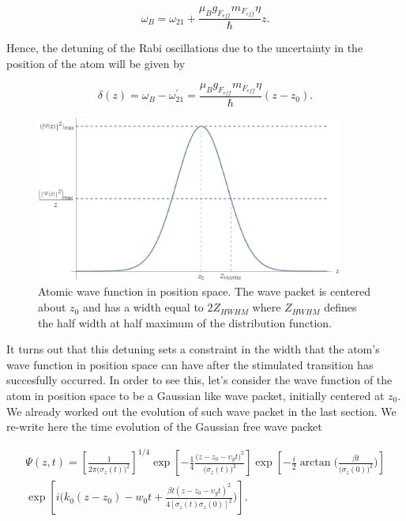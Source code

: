 \documentclass{article}
\begin{document}
\begin{equation}
  \omega_{B} =  \omega_{21} + \frac{\mu_{B} g_{F_{eff}} m_{F_{eff}} \eta}{\hbar} z.
\end{equation}

Hence, the detuning of the Rabi oscillations due to the uncertainty in the position of the atom will be given by

\begin{equation}\label{detunig_atom_width}
  \delta (z) = \omega_{B} - \omega_{21}^{\prime} = \frac{\mu_{B} g_{F_{eff}} m_{F_{eff}} \eta}{\hbar} (z-z_{0}).
\end{equation}

\begin{figure}
\centering
\includegraphics[width=0.9\textwidth]{atom_wave_func_pos_space.png}
\caption{Atomic wave function in position space. The wave packet is centered about $z_{0}$ and has a width equal to $2Z_{HWHM}$ where $Z_{HWHM}$ defines the half width at half maximum of the distribution function.}
\label{atom_wave_func_pos_space}
\end{figure}

It turns out that this detuning sets a constraint in the width that the atom's wave function in position space can have after the stimulated transition has succesfully occurred. In order to see this, let's consider the wave function of the atom in position space to be a Gaussian like wave packet, initially centered at $z_{0}$. We already worked out the evolution of such wave packet in the last section. We re-write here the time evolution of the Gaussian free wave packet

\begin{multline}\label{atom_wave_function_position_space}
    \Psi (z, t) = \left[\frac{1}{2 \pi \big(\sigma_{z}(t)\big)^2} \right]^{1/4} \exp \left[-\frac{1}{4} \frac{ \big(z - z_{0} - \upsilon_{g} t \big)^{2}}{\big(\sigma_{z}(t)\big)^{2}} \right] \exp \left[-\frac{i}{2} \arctan\Bigg(\frac{\beta t }{\big(\sigma_{z}(0)\big)^{2}}\Bigg) \right] \\ \exp \left[i \bigg(k_{0}(z-z_{0}) - w_{0}t + \frac{ \beta t (z - z_{0} - \upsilon_{g} t)^{2}}{ 4[\sigma_{z}(t)\sigma_{z}(0)]^{2}} \bigg) \right].
\end{multline}
\end{document}
